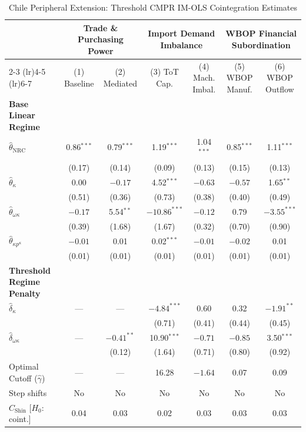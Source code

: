 \begin{table}[htbp]
	\centering
	\caption{Chile Peripheral Extension: Threshold CMPR IM-OLS Cointegration Estimates}
	\label{tab:chile_threshold_imols_main}
	\small
	\begin{tabular}{@{}lcccccc@{}}
		\toprule
		& \multicolumn{2}{c}{Trade \& Purchasing Power} & \multicolumn{2}{c}{Import Demand Imbalance} & \multicolumn{2}{c}{WBOP Financial Subordination} \\
		\cmidrule(lr){2-3} \cmidrule(lr){4-5} \cmidrule(lr){6-7}
		& (1) Baseline & (2) Mediated & (3) ToT Cap. & (4) Mach. Imbal. & (5) WBOP Manuf. & (6) WBOP Outflow \\
		\midrule
		\textbf{Base Linear Regime} & & & & & & \\
		$\hat{\theta}_{\text{NRC}}$ & 0.86$^{***}$ & 0.79$^{***}$ & 1.19$^{***}$ & 1.04$^{***}$ & 0.85$^{***}$ & 1.11$^{***}$ \\
		& (0.17) & (0.14) & (0.09) & (0.13) & (0.15) & (0.13) \\
		$\hat{\theta}_{\kappa}$ & 0.00 & $-0.17$ & 4.52$^{***}$ & $-0.63$ & $-0.57$ & 1.65$^{**}$ \\
		& (0.51) & (0.36) & (0.73) & (0.38) & (0.40) & (0.49) \\
		$\hat{\theta}_{\omega\kappa}$ & $-0.17$ & 5.54$^{**}$ & $-10.86^{***}$ & $-0.12$ & 0.79 & $-3.55^{***}$ \\
		& (0.39) & (1.68) & (1.67) & (0.32) & (0.70) & (0.90) \\
		$\hat{\theta}_{\kappa p^\kappa}$ & $-0.01$ & 0.01 & 0.02$^{***}$ & $-0.01$ & $-0.02$ & 0.01 \\
		& (0.01) & (0.01) & (0.01) & (0.01) & (0.01) & (0.01) \\
		\midrule
		\textbf{Threshold Regime Penalty} & & & & & & \\
		$\hat{\delta}_{\kappa}$ & --- & --- & $-4.84^{***}$ & 0.60 & 0.32 & $-1.91^{**}$ \\
		& & & (0.71) & (0.41) & (0.44) & (0.45) \\
		$\hat{\delta}_{\omega\kappa}$ & --- & $-0.41^{**}$ & 10.90$^{***}$ & $-0.71$ & $-0.85$ & 3.50$^{***}$ \\
		& & (0.12) & (1.64) & (0.71) & (0.80) & (0.92) \\
		\midrule
		Optimal Cutoff ($\hat{\gamma}$) & --- & --- & 16.28 & $-1.64$ & 0.07 & 0.09 \\
		Step shifts & No & No & No & No & No & No \\
		$C_{\text{Shin}}$ [$H_0$: coint.] & 0.04 & 0.03 & 0.02 & 0.03 & 0.03 & 0.03 \\

\end{tabular}
\end{table}
